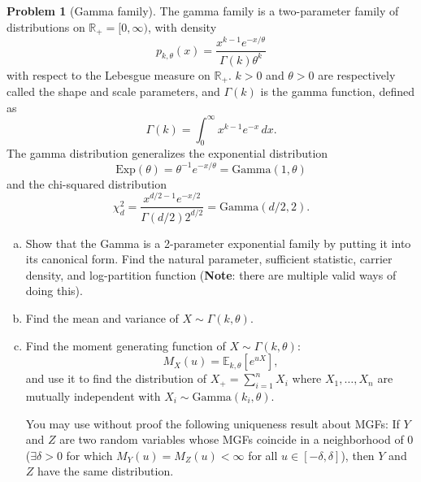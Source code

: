 \documentclass{article}
\newcommand{\EE}{\mathbb{E}}
\newcommand{\RR}{\mathbb{R}}
\theoremstyle{definition}
\newtheorem{problem}{Problem}
\begin{document}
\begin{problem}[Gamma family]

The gamma family is a two-parameter family of distributions on $\RR_+ = [0,\infty)$, with density
\[
p_{k,\theta}(x) = \frac{x^{k-1}e^{-x/\theta}}{\Gamma(k)\theta^k}
\]
with respect to the Lebesgue measure on $\RR_+$. $k>0$ and $\theta>0$ are respectively called the shape and scale parameters, and $\Gamma(k)$ is the gamma function, defined as
\[
\Gamma(k) = \int_0^\infty x^{k-1}e^{-x}\,d x.
\]
The gamma distribution generalizes the exponential distribution 
\[
\text{Exp}(\theta) = \theta^{-1}e^{-x/\theta} = \text{Gamma}(1,\theta)
\]
and the chi-squared distribution 
\[
\chi_d^2 = \frac{x^{d/2-1}e^{-x/2}}{\Gamma(d/2)2^{d/2}} = \text{Gamma}(d/2,2).
\]



\begin{enumerate}[(a)]
\item Show that the Gamma is a 2-parameter exponential family by putting it into its canonical form. Find the natural parameter, sufficient statistic, carrier density, and log-partition function ({\bf Note}: there are multiple valid ways of doing this).

  

\item Find the mean and variance of $X \sim \Gamma(k,\theta)$.

  

\item Find the moment generating function of $X\sim \Gamma(k,\theta)$:
\[
M_X(u) = \EE_{k,\theta}[e^{uX}],
\]
and use it to find the distribution of $X_+ = \sum_{i=1}^n X_i$ where $X_1,\ldots,X_n$ are mutually independent with $X_i \sim \text{Gamma}(k_i, \theta)$.

You may use without proof the following uniqueness result about MGFs:
If $Y$ and $Z$ are two random variables whose MGFs coincide in a neighborhood of 0 ($\exists \delta>0$ for which $M_Y(u) =M_Z(u) < \infty$ for all $u\in[-\delta,\delta]$), then $Y$ and $Z$ have the same distribution.


\end{enumerate}
\end{problem}
\end{document}
